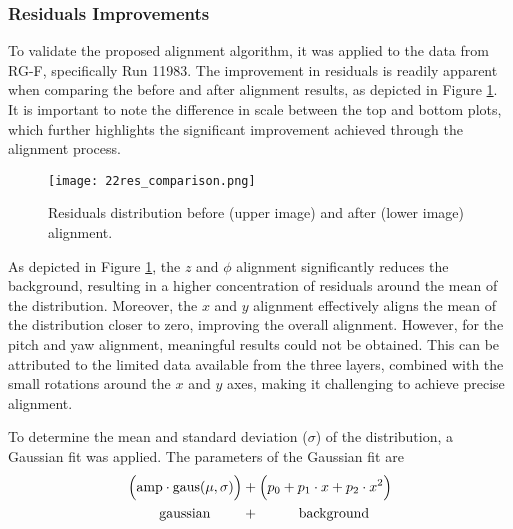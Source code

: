 \subsubsection{Residuals Improvements}
\label{12.22::residuals_improvements}
    To validate the proposed alignment algorithm, it was applied to the data from RG-F, specifically Run 11983.
    The improvement in residuals is readily apparent when comparing the before and after alignment results, as depicted in Figure \ref{fig::12.22::fmt_residuals_comparison}.
    It is important to note the difference in scale between the top and bottom plots, which further highlights the significant improvement achieved through the alignment process.

    \begin{figure}[t!]
        \texttt{[image: 22res\_comparison.png]}
        \caption[Residuals distribution improvement]
        {Residuals distribution before (upper image) and after (lower image) alignment.}
        \label{fig::12.22::fmt_residuals_comparison}
    \end{figure}

    As depicted in Figure \ref{fig::12.22::fmt_residuals_comparison}, the $z$ and $\phi$ alignment significantly reduces the background, resulting in a higher concentration of residuals around the mean of the distribution.
    Moreover, the $x$ and $y$ alignment effectively aligns the mean of the distribution closer to zero, improving the overall alignment.
    However, for the pitch and yaw alignment, meaningful results could not be obtained.
    This can be attributed to the limited data available from the three layers, combined with the small rotations around the $x$ and $y$ axes, making it challenging to achieve precise alignment.

    To determine the mean and standard deviation ($\sigma$) of the distribution, a Gaussian fit was applied. The parameters of the Gaussian fit are
     \begin{align*}
        \Big( \text{amp} \cdot \text{gaus}(\mu, \sigma) \Big) &+ \Big( p_0 + p_1\cdot x + p_2\cdot x^2 \Big) \\
        \text{gaussian} \hspace{0.8cm} &+ \hspace{1cm} \text{background}
    \end{align*}

